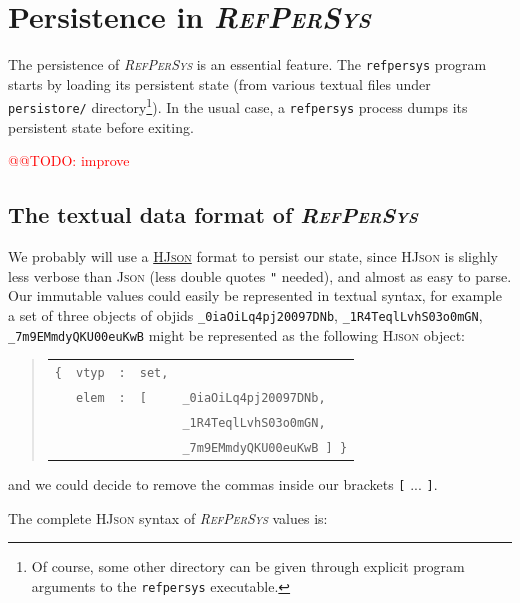 \documentclass[11pt,a4paper,svgnames]{article}
\newcommand{\RefPerSys}{{\textit{\textsc{RefPerSys}}}}
\begin{document}
\section{Persistence in \RefPerSys}
\label{sec:persistence}

The persistence of {\RefPerSys} is an essential feature. The
\texttt{refpersys} program starts by loading its persistent state
(from various textual files under \texttt{persistore/}
directory\footnote{Of course, some other directory can be given through
explicit program arguments to the \texttt{refpersys} executable.}). In
the usual case, a \texttt{refpersys} process dumps its persistent state before
exiting.

\textcolor{red}{@@TODO: improve}

\subsection{The textual data format of \RefPerSys}
\label{subsec:data-format}

We probably will use a \href{http://hjson.org}{\textsc{HJson}} format
to persist our state, since \textsc{HJson} is slighly less verbose
than \textsc{Json} (less double quotes \texttt{"} needed), and almost
as easy to parse. Our immutable values could easily be represented in
textual syntax, for example a set of three objects of objids
\texttt{\_0iaOiLq4pj20097DNb}, \texttt{\_1R4TeqlLvhS03o0mGN},
\texttt{\_7m9EMmdyQKU00euKwB} might be represented as the following
\textsc{Hjson} object:
\begin{quote}
\begin{relsize}{-1}
  \begin{tabular}{lllll}
    \texttt{\{} & \texttt{vtyp} & \texttt{:} & \texttt{set,} & ~  \\
    ~           & \texttt{elem} & \texttt{:} & \texttt{[} & \texttt{\_0iaOiLq4pj20097DNb,}  \\
    ~           & ~             & ~          & ~           & \texttt{\_1R4TeqlLvhS03o0mGN,} \\
    ~           & ~             & ~          & ~           & \texttt{\_7m9EMmdyQKU00euKwB ] \}} \\
  \end{tabular}
\end{relsize}
\end{quote}
and we could decide to remove the commas inside our brackets \texttt{[} {} ... \texttt{]}.
\medskip

The  complete \textsc{HJson} syntax of {\RefPerSys} values is:
\end{document}
